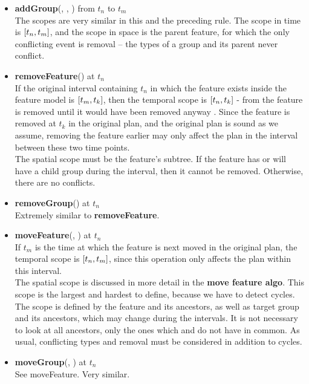 \begin{itemize}
  \item \textbf{addGroup}(, , ) from $t_n$ to $t_m$\\
    The scopes are very similar in this and the preceding rule. The scope in time is $\interval{t_n}{t_m}$, and the scope in space is the parent feature, for which the only conflicting event is removal -- the types of a group and its parent never conflict.
  \item \textbf{removeFeature}() at $t_n$\\
    If the original interval containing $t_n$ in which the feature exists inside the feature model is $\interval{t_m}{t_k}$, then the temporal scope is $\interval{t_n}{t_k}$ - from the feature is removed until it would have been removed anyway . Since the feature is removed at $t_k$ in the original plan, and the original plan is sound as we assume, removing the feature earlier may only affect the plan in the interval between these two time points.\\
    The spatial scope must be the feature's subtree. If the feature has or will have a child group during the interval, then it cannot be removed. Otherwise, there are no conflicts.
  \item \textbf{removeGroup}() at $t_n$\\
    Extremely similar to \textbf{removeFeature}. 
  \item \textbf{moveFeature}(, ) at $t_n$\\
  If $t_m$ is the time at which the feature is next moved in the original plan, the temporal scope is $\interval{t_n}{t_m}$, since this operation only affects the plan within this interval.\\
  The spatial scope is discussed in more detail in the \textbf{move feature algo}. This scope is the largest and hardest to define, because we have to detect cycles. The scope is defined by the feature and its ancestors, as well as target group and its ancestors, which may change during the intervals. It is not necessary to look at all ancestors, only the ones which  and  do not have in common. As usual, conflicting types and removal must be considered in addition to cycles.
  \item \textbf{moveGroup}(, ) at $t_n$\\
    See moveFeature. Very similar.

\end{itemize}
